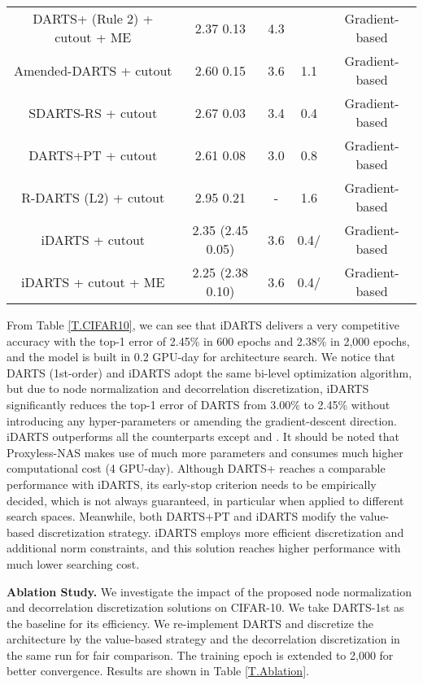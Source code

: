 \documentclass[journal]{IEEEtran}
\begin{document}
\begin{table*}[t]
\begin{center}
{\begin{tabular}{c|c|c|c|c}
DARTS+ (Rule 2) + cutout + ME \cite{DBLP:journals/corr/abs-1909-06035} & 2.37  0.13 & 4.3 &  &Gradient-based \\
Amended-DARTS + cutout \cite{DBLP:journals/corr/abs-1910-11831} & 2.60  0.15 & 3.6 & 1.1 &Gradient-based \\
SDARTS-RS + cutout \cite{DBLP:conf/icml/ChenH20} & 2.67  0.03 & 3.4 & 0.4 & Gradient-based \\
DARTS+PT + cutout \cite{DBLP:conf/iclr/Wang21} & 2.61  0.08 & 3.0 & 0.8 & Gradient-based\\
R-DARTS (L2) + cutout \cite{DBLP:journals/corr/abs-1909-09656} & 2.95  0.21 & - & 1.6 & Gradient-based\\
\hline
iDARTS + cutout & 2.35 (2.45  0.05) & 3.6 & 0.4/ & Gradient-based \\
iDARTS + cutout + ME & 2.25 (2.38  0.10) & 3.6 & 0.4/ &Gradient-based\\
\hline
\hline
\end{tabular}}
\label{T.CIFAR10}
\end{center}
\end{table*}


From Table \ref{T.CIFAR10}, we can see that iDARTS delivers a very competitive accuracy with the top-1 error of 2.45\% in 600 epochs and 2.38\% in 2,000 epochs, and the model is built in 0.2 GPU-day for architecture search. We notice that DARTS (1st-order) and iDARTS adopt the same bi-level optimization algorithm, but due to node normalization and decorrelation discretization, iDARTS significantly reduces the top-1 error of DARTS from 3.00\% to 2.45\% without introducing any hyper-parameters or amending the gradient-descent direction. iDARTS outperforms all the counterparts except \cite{DBLP:conf/iclr/CaiZH19} and \cite{DBLP:journals/corr/abs-1909-06035}. It should be noted that Proxyless-NAS \cite{DBLP:conf/iclr/CaiZH19} makes use of much more parameters and consumes much higher computational cost (4 GPU-day).  Although DARTS+ \cite{DBLP:journals/corr/abs-1909-06035} reaches a comparable performance with iDARTS, its early-stop criterion needs to be empirically decided, which is not always guaranteed, in particular when applied to different search spaces. Meanwhile, both DARTS+PT \cite{DBLP:conf/iclr/Wang21} and iDARTS modify the value-based discretization strategy. iDARTS employs more efficient discretization and additional norm constraints, and this solution reaches higher performance with much lower searching cost.



\label{EXP.Ablation}
\textbf{Ablation Study.} We investigate the impact of the proposed node normalization and decorrelation discretization solutions on CIFAR-10. We take DARTS-1st as the baseline for its efficiency. We re-implement DARTS and discretize the architecture by the value-based strategy and the decorrelation discretization in the same run for fair comparison. The training epoch is extended to 2,000 for better convergence. Results are shown in Table \ref{T.Ablation}.
\end{document}
